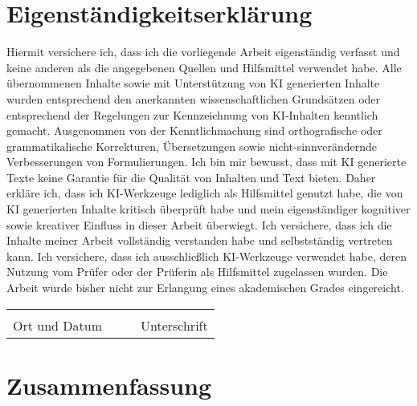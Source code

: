 \begin{appendices}

\chapter{Eigenständigkeitserklärung}
	
\vspace{1cm}
\noindent	
Hiermit versichere ich, dass ich die vorliegende Arbeit eigenständig verfasst und keine anderen als die angegebenen Quellen und Hilfsmittel verwendet habe. Alle übernommenen Inhalte sowie mit Unterstützung von KI generierten Inhalte wurden entsprechend den anerkannten wissenschaftlichen Grundsätzen oder entsprechend der
Regelungen zur Kennzeichnung von KI-Inhalten kenntlich gemacht. Ausgenommen von der Kenntlichmachung sind orthografische oder grammatikalische Korrekturen, Übersetzungen sowie nicht-sinnverändernde Verbesserungen von Formulierungen. Ich bin mir bewusst, dass mit KI generierte Texte keine Garantie für die Qualität von Inhalten und Text bieten. Daher erkläre ich, dass ich KI-Werkzeuge lediglich als Hilfsmittel genutzt habe, die von KI generierten Inhalte kritisch überprüft habe und mein eigenständiger kognitiver sowie kreativer Einfluss in dieser Arbeit überwiegt. Ich versichere, dass ich die Inhalte meiner Arbeit vollständig verstanden habe und selbstständig vertreten kann. Ich versichere, dass ich ausschließlich KI-Werkzeuge verwendet habe, deren Nutzung vom Prüfer oder der Prüferin als Hilfsmittel zugelassen wurden.
Die Arbeit wurde bisher nicht zur Erlangung eines akademischen Grades eingereicht. 

\vspace{1.5cm}
	
\noindent\begin{tabularx}{\textwidth}{XXXX}
	&&& \\
	\cline{1-1}\cline{4-4}\footnotesize\centering Ort und Datum		&&& \footnotesize\centering Unterschrift
\end{tabularx}
	
\newpage

\chapter{Zusammenfassung}


\lipsum[1-4]

\end{appendices}
 
\backmatter


